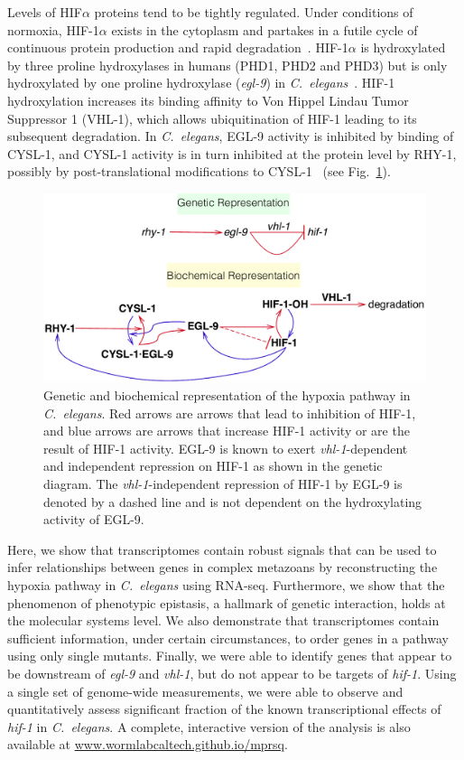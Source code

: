 \documentclass[9pt,twocolumn,twoside]{pnas-new}
\newcommand{\cel}{\emph{C.~elegans}}
\newcommand{\gene}[1]{\emph{#1}}
\newcommand{\eglp}{EGL-9}
\newcommand{\rhyp}{RHY-1}
\newcommand{\vhlp}{VHL-1}
\newcommand{\hifp}{HIF-1}
\newcommand{\cyslp}{CYSL-1}
\begin{document}
Levels of HIF$\alpha$ proteins tend to be tightly regulated. Under conditions of
normoxia, \hifp{}$\alpha$ exists in the cytoplasm and partakes in a futile cycle
of continuous protein production and rapid degradation~\cite{Huang1996}.
\hifp{}$\alpha$ is hydroxylated by three proline hydroxylases
in humans (PHD1, PHD2 and PHD3) but is only hydroxylated by one proline
hydroxylase (\gene{egl-9}) in \cel{}~\cite{Kaelin2008}. \hifp{} hydroxylation
increases its binding affinity to Von Hippel Lindau Tumor Suppressor 1
(\vhlp{}), which allows ubiquitination of \hifp{} leading to its subsequent
degradation. In \cel{}, \eglp{} activity is inhibited by binding of \cyslp{},
and \cyslp{} activity is in turn inhibited at the protein level by \rhyp{},
possibly by post-translational modifications to \cyslp{}~\cite{Ma2012} (see
Fig.~\ref{fig:pathway}).

\begin{figure}[tbhp]
\centering
\includegraphics[width=\linewidth]{figs/HIF1pathway.pdf}
\caption{
Genetic and biochemical representation of the hypoxia pathway in \cel{}.
Red arrows are arrows that lead to inhibition of \hifp{}, and blue arrows
are arrows that increase \hifp{} activity or are the result of \hifp{} activity.
\eglp{} is known to exert \gene{vhl-1}-dependent and independent repression
on \hifp{} as shown in the genetic diagram. The \gene{vhl-1}-independent
repression of \hifp{} by \eglp{} is denoted by a dashed line and is not dependent
on the hydroxylating activity of \eglp{}.
}
\label{fig:pathway}
\end{figure}

Here, we show that transcriptomes contain robust signals that can be
used to infer relationships between genes in complex metazoans by reconstructing
the hypoxia pathway in \cel{} using RNA-seq.
Furthermore, we show that the phenomenon of phenotypic epistasis, a hallmark of
genetic interaction, holds at the molecular systems level.
We also demonstrate that transcriptomes contain sufficient information, under
certain circumstances, to order genes in a pathway using only single mutants.
Finally, we were able to identify genes that appear to be downstream of \gene{egl-9}
and \gene{vhl-1}, but do not appear to be targets of \gene{hif-1}.
Using a single set of genome-wide measurements, we were able to observe and
quantitatively assess  significant fraction of the known transcriptional
effects of \gene{hif-1} in \cel{}.
A complete, interactive version of the analysis is also available at
\url{www.wormlabcaltech.github.io/mprsq}.
\end{document}
